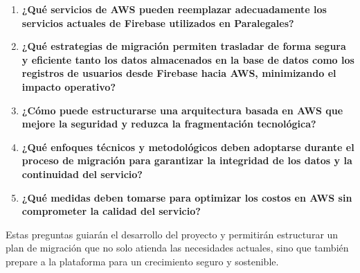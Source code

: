 \begin{enumerate}
  \item \textbf{¿Qué servicios de AWS pueden reemplazar adecuadamente los servicios actuales de Firebase utilizados en Paralegales?}
  \item \textbf{¿Qué estrategias de migración permiten trasladar de forma segura y eficiente tanto los datos almacenados en la base de datos como los registros de usuarios desde Firebase hacia AWS, minimizando el impacto operativo?}
  \item \textbf{¿Cómo puede estructurarse una arquitectura basada en AWS que mejore la seguridad y reduzca la fragmentación tecnológica?}
  \item \textbf{¿Qué enfoques técnicos y metodológicos deben adoptarse durante el proceso de migración para garantizar la integridad de los datos y la continuidad del servicio?}
  \item \textbf{¿Qué medidas deben tomarse para optimizar los costos en AWS sin comprometer la calidad del servicio?}
\end{enumerate}

Estas preguntas guiarán el desarrollo del proyecto y permitirán estructurar un plan de migración que no solo atienda las necesidades actuales, sino que también prepare a la plataforma para un crecimiento seguro y sostenible.